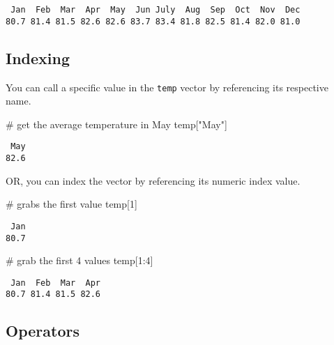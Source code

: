 \documentclass[
  letterpaper,
  DIV=11,
  numbers=noendperiod]{scrreprt}
\newenvironment{Shaded}{\begin{snugshade}}{\end{snugshade}}
\newcommand{\CommentTok}[1]{\textcolor[rgb]{0.37,0.37,0.37}{#1}}
\newcommand{\DecValTok}[1]{\textcolor[rgb]{0.68,0.00,0.00}{#1}}
\newcommand{\NormalTok}[1]{\textcolor[rgb]{0.00,0.23,0.31}{#1}}
\newcommand{\SpecialCharTok}[1]{\textcolor[rgb]{0.37,0.37,0.37}{#1}}
\newcommand{\StringTok}[1]{\textcolor[rgb]{0.13,0.47,0.30}{#1}}
\begin{document}
\begin{verbatim}
 Jan  Feb  Mar  Apr  May  Jun July  Aug  Sep  Oct  Nov  Dec 
80.7 81.4 81.5 82.6 82.6 83.7 83.4 81.8 82.5 81.4 82.0 81.0 
\end{verbatim}

\subsection*{Indexing}\label{indexing}

You can call a specific value in the \texttt{temp} vector by referencing
its respective name.

\begin{Shaded}
\begin{Highlighting}[]
\CommentTok{\# get the average temperature in May}
\NormalTok{temp[}\StringTok{"May"}\NormalTok{]}
\end{Highlighting}
\end{Shaded}

\begin{verbatim}
 May 
82.6 
\end{verbatim}

OR, you can index the vector by referencing its numeric index value.

\begin{Shaded}
\begin{Highlighting}[]
\CommentTok{\# grabs the first value}
\NormalTok{temp[}\DecValTok{1}\NormalTok{]}
\end{Highlighting}
\end{Shaded}

\begin{verbatim}
 Jan 
80.7 
\end{verbatim}

\begin{Shaded}
\begin{Highlighting}[]
\CommentTok{\# grab the first 4 values}
\NormalTok{temp[}\DecValTok{1}\SpecialCharTok{:}\DecValTok{4}\NormalTok{]}
\end{Highlighting}
\end{Shaded}

\begin{verbatim}
 Jan  Feb  Mar  Apr 
80.7 81.4 81.5 82.6 
\end{verbatim}

\subsection*{Operators}\label{operators}
\end{document}

